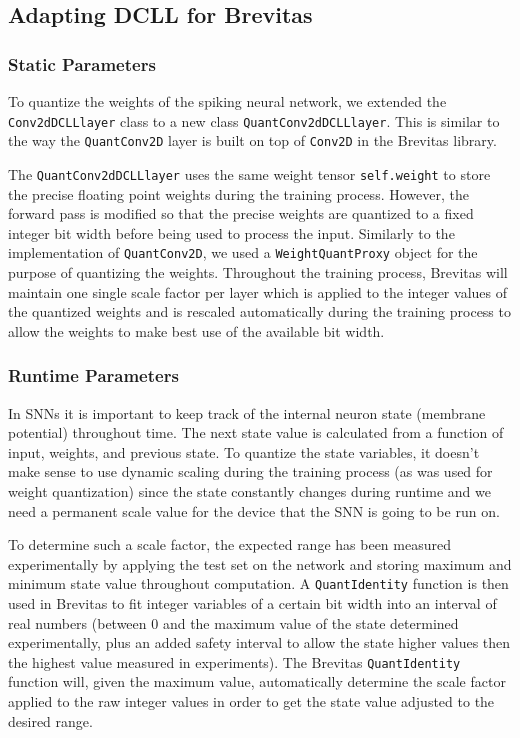 \documentclass[parskip=true, 10pt]{scrartcl}
\begin{document}
\subsection{Adapting DCLL for Brevitas}

\label{sec:dcll_brevitas}

\subsubsection{Static Parameters}

To quantize the weights of the spiking neural network, we extended the \texttt{Conv2dDCLLlayer} class to a new class \texttt{QuantConv2dDCLLlayer}. This is similar to the way the \texttt{QuantConv2D} layer is built on top of \texttt{Conv2D} in the Brevitas library.

The \texttt{QuantConv2dDCLLlayer} uses the same weight tensor \texttt{self.weight} to store the precise floating point weights during the training process. However, the forward pass is modified so that the 
precise weights are quantized to a fixed integer bit width before being used to process the input. Similarly to the implementation of \texttt{QuantConv2D}, we used a \texttt{WeightQuantProxy} object for the purpose of quantizing the weights. Throughout the training process, Brevitas will maintain one single scale factor per layer which is applied to the integer values of the quantized weights and is rescaled automatically during the training process to allow the weights to make best use of the available bit width.

\subsubsection{Runtime Parameters}

In SNNs it is important to keep track of the internal neuron state (membrane potential) throughout time.
The next state value is calculated from a function of input, weights, and previous state. To quantize the state variables, it doesn't make sense to use dynamic scaling during the training process (as was used for weight quantization) since the state constantly changes during runtime and we need a permanent scale value for the device that the SNN is going to be run on.

To determine such a scale factor, the expected range has been measured experimentally by applying the test set on the network and storing maximum and minimum state value throughout computation. A \texttt{QuantIdentity} function is then used in Brevitas to fit integer variables of a certain bit width into an interval of real numbers (between 0 and the maximum value of the state determined experimentally, plus an added safety interval to allow the state higher values then the highest value measured in experiments). The Brevitas \texttt{QuantIdentity} function will, given the maximum value, automatically determine the scale factor applied to the raw integer values in order to get the state value adjusted to the desired range.
\end{document}
